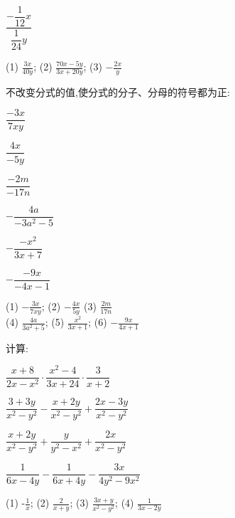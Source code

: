 \documentclass[cn,blue,12pt]{elegantbook}
\begin{document}
\begin{xiti}[resume]
\begin{multicols}{3}
\begin{xiti}
        \item \(\dfrac{-\dfrac{1}{12}x}{\dfrac{1}{24}y}\)
        \end{xiti}
    \end{multicols}
\begin{solution}
        (1) \(\frac{3x}{40y}\); (2) \(\frac{70x-5y}{3x+20y}\); (3) \(-\frac{2x}{y}\)\\
\end{solution}
\item 不改变分式的值,使分式的分子、分母的符号都为正:
    \begin{multicols}{3}
        \begin{xiti}
            \setlength{\itemsep}{1.5ex}
        \item \(\dfrac{-3x}{7xy}\)
        \item \(\dfrac{4x}{-5y}\)
        \item \(\dfrac{-2m}{-17n}\)
        \item \(-\dfrac{4a}{-3a^2-5}\)
        \item \(-\dfrac{-x^2}{3x+7}\)
        \item \(-\dfrac{-9x}{-4x-1}\)
        \end{xiti}
    \end{multicols}
\begin{solution}
        (1) \(-\frac{3x}{7xy}\); (2) \(-\frac{4x}{5y}\) (3) \(\frac{2m}{17n}\)\\
        (4) \(\frac{4a}{3a^2+5}\); (5) \(\frac{x^2}{3x+1}\); (6) \(-\frac{9x}{4x+1}\)
\end{solution}
\item 计算:
    \begin{multicols}{2}
        \begin{xiti}
            \setlength{\itemsep}{4.5ex}
        \item \(\dfrac{x+8}{2x-x^2}\cdot \dfrac{x^2-4}{3x+24}\cdot \dfrac{3}{x+2}\)
        \item \(\dfrac{3+3y}{x^2-y^2}-\dfrac{x+2y}{x^2-y^2}+\dfrac{2x-3y}{x^2-y^2}\)
        \item \(\dfrac{x+2y}{x^2-y^2}+\dfrac{y}{y^2-x^2}+\dfrac{2x}{x^2-y^2}\)
        \item \(\dfrac{1}{6x-4y}-\dfrac{1}{6x+4y}-\dfrac{3x}{4y^2-9x^2}\)
        \end{xiti}
    \end{multicols}
\begin{solution}
        (1) -\(\frac{1}{x}\); (2) \(\frac{2}{x+y}\); (3) \(\frac{3x+y}{x^2-y^2}\); (4) \(\frac{1}{3x-2y}\)
\end{solution}
\end{xiti}
\end{document}
